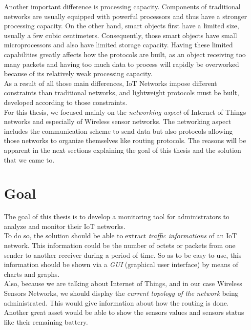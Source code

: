 Another important difference is processing capacity. Components of traditional networks are usually equipped with powerful processors and thus have a stronger processing capacity. On the other hand, smart objects first have a limited size, usually a few cubic centimeters. Consequently, those smart objects have small microprocessors and also have limited storage capacity. Having these limited capabilities greatly affects how the protocols are built, as an object receiving too many packets and having too much data to process will rapidly be overworked because of its relatively weak processing capacity. \\

As a result of all those main differences, IoT Networks impose different constraints than traditional networks, and lightweight protocols must be built, developed according to those constraints.\\

For this thesis, we focused mainly on the \textit{networking aspect} of Internet of Things networks and especially of Wireless sensor networks. The networking aspect includes the communication scheme to send data but also protocols allowing those networks to organize themselves like routing protocols. The reasons will be apparent in the next sections explaining the goal of this thesis and the solution that we came to.

\section*{Goal}

The goal of this thesis is to develop a monitoring tool for administrators to analyze and monitor their IoT networks.\\

To do so, the solution should be able to extract \textit{traffic informations} of an IoT network. This information could be the number of octets or packets from one sender to another receiver during a period of time. So as to be easy to use, this information should be shown via a \textit{GUI} (graphical user interface) by means of charts and graphs. \\

Also, because we are talking about Internet of Things, and in our case Wireless Sensors Networks, we should display the \textit{current topology of the network} being administrated. This would give information about how the routing is done. Another great asset would be able to show the sensors values and sensors status like their remaining battery.\\

